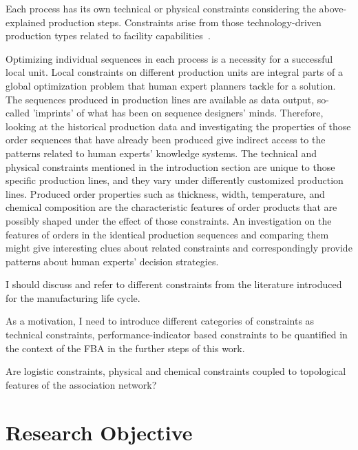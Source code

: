 {\color{red}
	
	Each process has its own technical or physical constraints considering the above-explained production steps. Constraints arise from those technology-driven production types related to facility capabilities~\cite{cowling2001design}.
	
	Optimizing individual sequences in each process is a necessity for a successful local unit. Local constraints on different production units are integral parts of a global optimization problem that human expert planners tackle for a solution. The sequences produced in production lines are available as data output, so-called 'imprints' of what has been on sequence designers' minds. Therefore, looking at the historical production data and investigating the properties of those order sequences that have already been produced give indirect access to the patterns related to human experts' knowledge systems. The technical and physical constraints mentioned in the introduction section are unique to those specific production lines, and they vary under differently customized production lines. Produced order properties such as thickness, width, temperature, and chemical composition are the characteristic features of order products that are possibly shaped under the effect of those constraints. An investigation on the features of orders in the identical production sequences and comparing them might give interesting clues about related constraints and correspondingly provide patterns about human experts' decision strategies.
	
	I should discuss and refer to different constraints from the literature introduced for the manufacturing life cycle.
	
	As a motivation, I need to introduce different categories of constraints as technical constraints, performance-indicator based constraints to be quantified in the context of the FBA in the further steps of this work.
	
	Are logistic constraints, physical and chemical constraints coupled to topological features of the association network?
}

\section{Research Objective}

